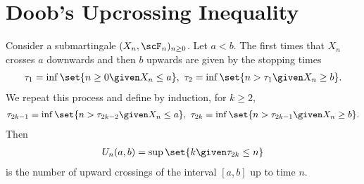 \documentclass[../aipt.tex]{subfiles}
\begin{document}
\section{Doob's Upcrossing Inequality}

Consider a submartingale $(X_n,\scF_n)_{n\geq0}$. Let $a<b$. The first times that $X_n$ crosses $a$ downwards and then $b$ upwards are given by the stopping times
\begin{align*}
\tau_1 = \inf\set{n\geq 0 \given X_n \leq a},\ \tau_2 = \inf\set{n>\tau_1 \given X_n\geq b}.
\end{align*}
We repeat this process and define by induction, for $k\geq2$,
\begin{align*}
\tau_{2k-1} = \inf\set{n> \tau_{2k-2} \given X_n \leq a},\ \tau_{2k} = \inf\set{n>\tau_{2k-1} \given X_n\geq b}.
\end{align*}
Then 
\begin{align*}
U_n(a,b) = \sup\set{k \given \tau_{2k} \leq n}
\end{align*}
is the number of upward crossings of the interval $[a,b]$ up to time $n$.
\end{document}
